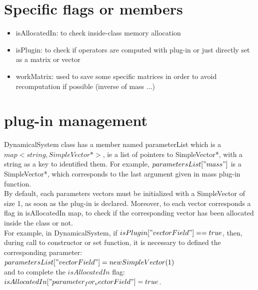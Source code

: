 \documentclass[10pt]{article}
\begin{document}
\section{Specific flags or members}

\begin{itemize}
\item isAllocatedIn: to check inside-class memory allocation
\item isPlugin: to check if operators are computed with plug-in or just directly set as a matrix or vector
\item workMatrix: used to save some specific matrices in order to avoid recomputation if possible (inverse of mass ...)
\end{itemize}

\section{plug-in management}
DynamicalSystem class has a member named parameterList which is a $map<string, SimpleVector*>$, ie a list of
pointers to SimpleVector*, with a string as a key to identified them. 
For example, $parametersList["mass"]$ is a SimpleVector*, which corresponds to the last argument given in 
mass plug-in function. \\
By default, each parameters vectors must be initialized with a SimpleVector of size 1, as soon as the plug-in is
declared. Moreover, to each vector corresponds a flag in isAllocatedIn map, to check if the corresponding vector has been 
allocated inside the class or not. \\ 
For example, in DynamicalSystem, if $isPlugin["vectorField"]==true$, then, during call to constructor or set function,
it is necessary to defined the corresponding parameter: \\
$parametersList["vectorField"] = new SimpleVector(1)$ \\
and to complete the $isAllocatedIn$ flag: \\
$isAllocatedIn["parameter_for_vectorField"] = true$. \\
\end{document}
